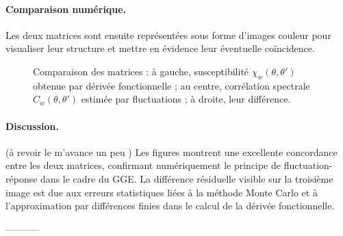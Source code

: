 \paragraph{Comparaison numérique.}
%

Les deux matrices sont ensuite représentées sous forme d'images couleur pour visualiser leur structure et mettre en évidence leur éventuelle coïncidence.

\begin{figure}[H]
    \centering
    \caption{Comparaison des matrices : à gauche, susceptibilité \( \chi_w(\theta,\theta') \) obtenue par dérivée fonctionnelle ; au centre, corrélation spectrale \( C_w(\theta,\theta') \) estimée par fluctuations ; à droite, leur différence.}
    \label{fig:comparison_chi_C}
\end{figure}

\paragraph{Discussion.}

{\color{blue} { (\color{red}à revoir le m'avance un peu )} Les figures montrent une excellente concordance entre les deux matrices, confirmant numériquement le principe de fluctuation-réponse dans le cadre du GGE. La différence résiduelle visible sur la troisième image est due aux erreurs statistiques liées à la méthode Monte Carlo et à l’approximation par différences finies dans le calcul de la dérivée fonctionnelle.} 

-----------



